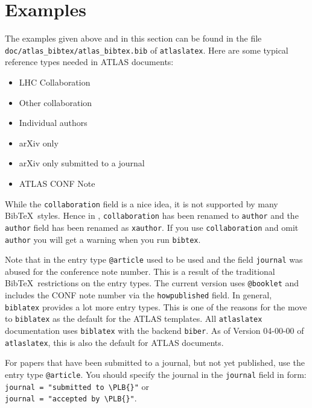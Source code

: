 \documentclass[UKenglish, texlive=2016]{\ATLASLATEXPATH atlasdoc}
\newcommand*{\BibTeX}{Bib\TeX}
\newcommand{\File}[1]{\texttt{#1}\xspace}
\newcommand{\Macro}[1]{\texttt{\textbackslash #1}\xspace}
\newcommand{\Package}[1]{\texttt{#1}\xspace}
\begin{document}
\section{Examples}
\label{sec:example}

The examples given above and in this section can be found in the file \File{doc/atlas\_bibtex/atlas\_bibtex.bib}
of \Package{atlaslatex}.
Here are some typical reference types needed in ATLAS documents:
\begin{itemize}
\item LHC Collaboration~\cite{lhcCollaboration:2012}
\item Other collaboration~\cite{otherCollaboration:2007}
\item Individual authors~\cite{authors:2008}
\item arXiv only~\cite{arxivOnly:2009}
\item arXiv only submitted to a journal~\cite{arxivSub:2011}
\item ATLAS CONF Note~\cite{ATLAS-CONF-2012-058}
\end{itemize}

While the \texttt{collaboration} field is a nice idea, it is not supported by many \BibTeX\ styles.
Hence in , \texttt{collaboration} has been renamed to \texttt{author} and
the \texttt{author} field has been renamed as \texttt{xauthor}. If you use \texttt{collaboration} and omit
\texttt{author} you will get a warning when you run \texttt{bibtex}.

Note that in  the entry type \texttt{@article} used to be used and the field \texttt{journal}
was abused for the conference note number. This is a result of the traditional \BibTeX\ restrictions on the entry types.
The current version uses \texttt{@booklet} and includes the CONF note number via the \texttt{howpublished} field.
In general, \texttt{biblatex} provides a lot more entry types.
This is one of the reasons for the  move to \texttt{biblatex} as the default for the ATLAS templates.
All \Package{atlaslatex} documentation uses \Package{biblatex} with the backend \Package{biber}.
As of Version 04-00-00 of \Package{atlaslatex}, this is also the default for ATLAS documents.

For papers that have been submitted to a journal, but not yet published, use the entry type \texttt{@article}.
You should specify the journal in the \texttt{journal} field in form:\\
\texttt{journal = "submitted to \Macro{PLB}{}\{\}"} or\\
\texttt{journal = "accepted by \Macro{PLB}{}\{\}"}.
\end{document}
